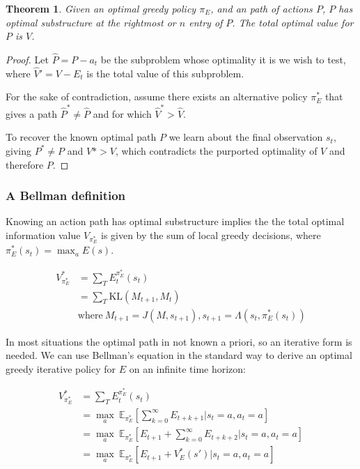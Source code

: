 \documentclass[9pt,twocolumn,twoside]{pnas-new}
\newtheorem{theorem}{Theorem}
\begin{document}
\begin{theorem}
    Given an optimal greedy policy $\pi_E$, and an path of actions $P$, $P$ has optimal substructure at the rightmost or $n$ entry of $P$. The total optimal value for $P$ is $V$.
\end{theorem}
\begin{proof}
    Let $\hat P = P - a_t$ be the subproblem whose optimality it is we wish to test, where $\hat V' = V - E_t$ is the total value of this subproblem. 
    
    For the sake of contradiction, assume there exists an alternative policy $\pi_E^*$ that gives a path $\hat P^* \neq \hat P$ and for which $\hat V^* > \hat V$. 

    To recover the known optimal path $P$ we learn about the final observation $s_t$, giving $P^* \neq P$ and $V* > V$, which contradicts the purported optimality of $V$ and therefore $P$.
\end{proof}


\subsubsection*{A Bellman definition}
Knowing an action path has optimal substructure implies the the total optimal information value $V_{\pi_E^*}$ is given by the sum of local greedy decisions, where $\pi^*_E(s_t) = \max_{a} E(s)$.

\begin{equation} \label{eq:maxE}
    \begin{split}
        V^*_{\pi_E^*} &= \sum_T E_t^{\pi^*_E} (s_t) \\
                      &= \sum_T \text{KL} (M_{t+1}, M_t) \\ 
                      & \text{where}\ M_{t+1} = J(M, s_{t+1}), s_{t+1} = \Lambda(s_t, \pi^*_E(s_t))
    \end{split}
\end{equation}

In most situations the optimal path in not known a priori, so an iterative form is needed. We can use Bellman's equation in the standard way to derive an optimal greedy iterative policy for $E$ on an infinite time horizon:

\begin{equation} \label{eq:bellman}
    \begin{split}
        V^*_{\pi_E^*} &= \sum_T E_t^{\pi^*_E} (s_t) \\
                      &{}= \max_a\ \mathbb{E}_{\pi^*_E} [\sum^{\infty}_{k=0} E_{t+k+1} | s_t = a, a_t = a] \\
                      &{}= \max_a\ \mathbb{E}_{\pi^*_E} [E_{t+1} + \sum^{\infty}_{k=0} E_{t+k+2} | s_t = a, a_t = a] \\
                      &= \max_a\ \mathbb{E}_{\pi^*_E} [E_{t+1} + V^*_E (s') | s_t = a, a_t = a]
    \end{split}
\end{equation}
\end{document}
